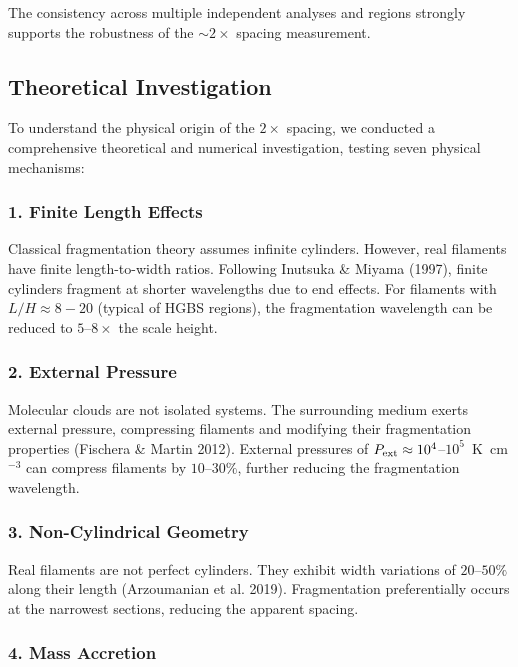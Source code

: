 \documentclass[11pt,a4paper]{article}
\begin{document}
The consistency across multiple independent analyses and regions strongly supports the robustness of the $\sim2\times$ spacing measurement.

\subsection{Theoretical Investigation}

To understand the physical origin of the $2\times$ spacing, we conducted a comprehensive theoretical and numerical investigation, testing seven physical mechanisms:

\subsubsection{1. Finite Length Effects}

Classical fragmentation theory assumes infinite cylinders. However, real filaments have finite length-to-width ratios. Following Inutsuka \& Miyama (1997), finite cylinders fragment at shorter wavelengths due to end effects. For filaments with $L/H \approx 8-20$ (typical of HGBS regions), the fragmentation wavelength can be reduced to $5$--$8\times$ the scale height.

\subsubsection{2. External Pressure}

Molecular clouds are not isolated systems. The surrounding medium exerts external pressure, compressing filaments and modifying their fragmentation properties (Fischera \& Martin 2012). External pressures of $P_{\rm ext} \approx 10^4$--$10^5$~K~cm$^{-3}$ can compress filaments by $10$--$30\%$, further reducing the fragmentation wavelength.

\subsubsection{3. Non-Cylindrical Geometry}

Real filaments are not perfect cylinders. They exhibit width variations of $20$--$50\%$ along their length (Arzoumanian et al. 2019). Fragmentation preferentially occurs at the narrowest sections, reducing the apparent spacing.

\subsubsection{4. Mass Accretion}
\end{document}

